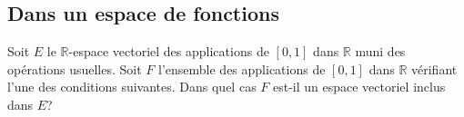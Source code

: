 \vspace{1em}

  \subsection{Dans un espace de fonctions}

  Soit $E$ le $\mathbb{R}$-espace vectoriel des applications de $[0,1]$ dans $\mathbb{R}$ muni des opérations usuelles. \newline 
  Soit $F$ l'ensemble des applications de $[0,1]$ dans $\mathbb{R}$ vérifiant l'une des conditions suivantes. \newline 
  Dans quel cas $F$ est-il un espace vectoriel inclus dans $E$?


